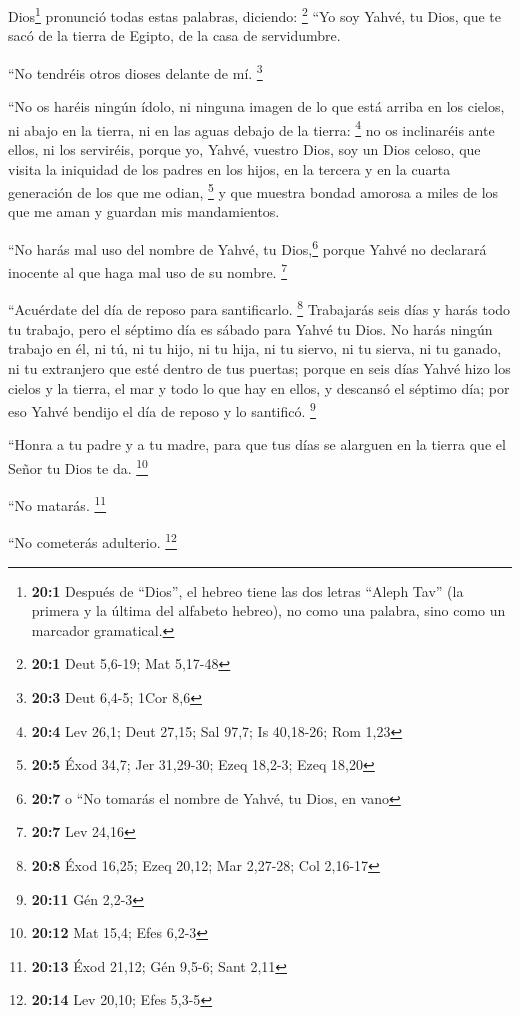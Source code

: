 \begin{paracol}{2}
 Dios\footnote{\textbf{20:1} Después de ``Dios'', el
  hebreo tiene las dos letras ``Aleph Tav'' (la primera y la última del
  alfabeto hebreo), no como una palabra, sino como un marcador
  gramatical.} pronunció todas estas palabras, diciendo: \footnote{\textbf{20:1}
  Deut 5,6-19; Mat 5,17-48}  ``Yo soy Yahvé, tu Dios, que
te sacó de la tierra de Egipto, de la casa de servidumbre.

 ``No tendréis otros dioses delante de mí. \footnote{\textbf{20:3}
  Deut 6,4-5; 1Cor 8,6}

 ``No os haréis ningún ídolo, ni ninguna imagen de lo que
está arriba en los cielos, ni abajo en la tierra, ni en las aguas debajo
de la tierra: \footnote{\textbf{20:4} Lev 26,1; Deut 27,15; Sal 97,7; Is
  40,18-26; Rom 1,23}  no os inclinaréis ante ellos, ni
los serviréis, porque yo, Yahvé, vuestro Dios, soy un Dios celoso, que
visita la iniquidad de los padres en los hijos, en la tercera y en la
cuarta generación de los que me odian, \footnote{\textbf{20:5} Éxod
  34,7; Jer 31,29-30; Ezeq 18,2-3; Ezeq 18,20}  y que
muestra bondad amorosa a miles de los que me aman y guardan mis
mandamientos.

 ``No harás mal uso del nombre de Yahvé, tu
Dios,\footnote{\textbf{20:7} o ``No tomarás el nombre de Yahvé, tu Dios,
  en vano} porque Yahvé no declarará inocente al que haga mal uso de su
nombre. \footnote{\textbf{20:7} Lev 24,16}

 ``Acuérdate del día de reposo para santificarlo.
\footnote{\textbf{20:8} Éxod 16,25; Ezeq 20,12; Mar 2,27-28; Col 2,16-17}
 Trabajarás seis días y harás todo tu trabajo,
 pero el séptimo día es sábado para Yahvé tu Dios. No
harás ningún trabajo en él, ni tú, ni tu hijo, ni tu hija, ni tu siervo,
ni tu sierva, ni tu ganado, ni tu extranjero que esté dentro de tus
puertas;  porque en seis días Yahvé hizo los cielos y la
tierra, el mar y todo lo que hay en ellos, y descansó el séptimo día;
por eso Yahvé bendijo el día de reposo y lo santificó. \footnote{\textbf{20:11}
  Gén 2,2-3}

 ``Honra a tu padre y a tu madre, para que tus días se
alarguen en la tierra que el Señor tu Dios te da. \footnote{\textbf{20:12}
  Mat 15,4; Efes 6,2-3}

 ``No matarás. \footnote{\textbf{20:13} Éxod 21,12; Gén
  9,5-6; Sant 2,11}

 ``No cometerás adulterio. \footnote{\textbf{20:14} Lev
  20,10; Efes 5,3-5}


\end{paracol}
